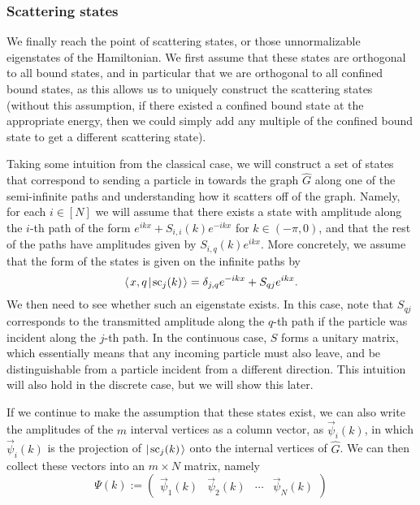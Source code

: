 \documentclass[../thesis-main/thesis-main]{subfiles}
\begin{document}


\subsubsection{Scattering states}

We finally reach the point of scattering states, or those unnormalizable eigenstates of the Hamiltonian.  We first assume that these states are orthogonal to all bound states, and in particular that we are orthogonal to all confined bound states, as this allows us to uniquely construct the scattering states (without this assumption, if there existed a confined bound state at the appropriate energy, then we could simply add any multiple of the confined bound state to get a different scattering state).

Taking some intuition from the classical case, we will construct a set of states that correspond to sending a particle in towards the graph $\widehat{G}$ along one of the semi-infinite paths and understanding how it scatters off of the graph.  Namely, for each $i\in[N]$ we will assume that there exists a state with amplitude along the $i$-th path of the form $e^{i k x} + S_{i,i}(k)e^{-i k x}$ for $k\in (-\pi, 0)$, and that the rest of the paths have amplitudes given by $S_{i,q}(k)e^{ikx}$.  More concretely, we assume that the form of the states is given on the infinite paths by
\begin{equation}
  \langle\mspace{2mu} x,q \mspace{2mu} | \mspace{2mu} \text{sc}_{j}(k)\mspace{2mu} \rangle = \delta_{j,q} e^{-i k x} + S_{qj} e^{i k x}.\label{eq:scattering_amplitude_paths}
\end{equation}
We then need to see whether such an eigenstate exists.  In this case, note that $S_{qj}$ corresponds to the transmitted amplitude along the $q$-th path if the particle was incident along the $j$-th path.  In the continuous case, $S$ forms a unitary matrix, which essentially means that any incoming particle must also leave, and be distinguishable from a particle incident from a different direction.  This intuition will also hold in the discrete case, but we will show this later.


If we continue to make the assumption that these states exist, we can also write the amplitudes of the $m$ interval vertices as a column vector, as $\vec{\psi}_i(k)$, in which $\vec{\psi}_{i}(k)$ is the projection of $|\mspace{2mu} \text{sc}_j(k) \mspace{2mu} \rangle$ onto the internal vertices of $\widehat{G}$.  We can then collect these vectors into an $m\times N$ matrix, namely
\begin{equation}
  \Psi(k) := \begin{pmatrix} \vec{\psi}_1(k) & \vec{\psi}_2(k) & \cdots & \vec{\psi}_N(k)\end{pmatrix}
\end{equation}
\end{document}
